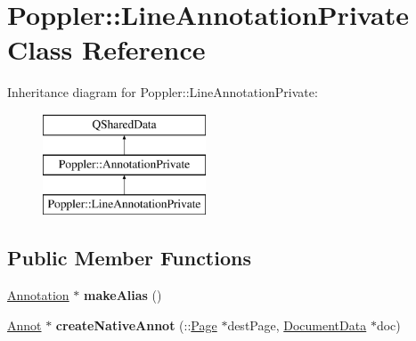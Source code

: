 \hypertarget{class_poppler_1_1_line_annotation_private}{}\section{Poppler\+:\+:Line\+Annotation\+Private Class Reference}
\label{class_poppler_1_1_line_annotation_private}
Inheritance diagram for Poppler\+:\+:Line\+Annotation\+Private\+:\begin{figure}[H]
\begin{center}
\leavevmode
\includegraphics[height=3.000000cm]{class_poppler_1_1_line_annotation_private}
\end{center}
\end{figure}
\subsection*{Public Member Functions}
\begin{DoxyCompactItemize}
\item 
\mbox{\label{class_poppler_1_1_line_annotation_private_a5d1daca68df0c8142e273d6b215b282f}} 
\hyperlink{class_poppler_1_1_annotation}{Annotation} $\ast$ {\bfseries make\+Alias} ()
\item 
\mbox{\label{class_poppler_1_1_line_annotation_private_a731ad9de18078ec5a9bf4e3d038c7c8e}} 
\hyperlink{class_annot}{Annot} $\ast$ {\bfseries create\+Native\+Annot} (\+::\hyperlink{class_poppler_1_1_page}{Page} $\ast$dest\+Page, \hyperlink{class_poppler_1_1_document_data}{Document\+Data} $\ast$doc)
\end{DoxyCompactItemize}
